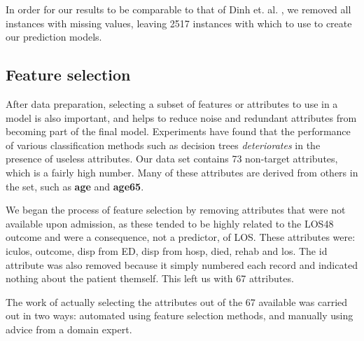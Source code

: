 In order for our results to be comparable to that of Dinh
et. al. \citep{Dinh2013a}, we removed all instances with missing values,
leaving 2517 instances with which to use to create our prediction models.

\subsection{Feature selection}
After data preparation, selecting a subset of features or attributes to use
in a model is also important, and helps to reduce noise and redundant
attributes from becoming part of the final model. Experiments have found that
the performance of various classification methods such as decision trees
\textit{deteriorates} in the presence of useless attributes.
Our data set contains 73
non-target attributes, which is a fairly high number. Many of these attributes
are derived from others in the set, such as \textbf{age} and \textbf{age65}.

We began the process of feature selection by removing attributes that were
not available upon admission, as these tended to be highly related to the
LOS48 outcome and were a consequence, not a predictor, of LOS. These attributes
were: iculos, outcome, disp from ED, disp from hosp, died, rehab and los.
The id attribute was also removed because it simply numbered each record and
indicated nothing about the patient themself. This left us with 67 attributes.

The work of actually selecting the attributes out of the 67 available was
carried out in two ways: automated using feature selection methods, and
manually using advice from a domain expert.

